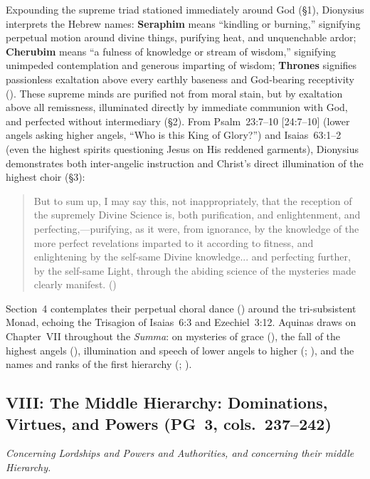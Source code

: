 Expounding the supreme triad stationed immediately around God (\S 1), Dionysius interprets the Hebrew names: \textbf{Seraphim} means ``kindling or burning,'' signifying perpetual motion around divine things, purifying heat, and unquenchable ardor; \textbf{Cherubim} means ``a fulness of knowledge or stream of wisdom,'' signifying unimpeded contemplation and generous imparting of wisdom; \textbf{Thrones} signifies passionless exaltation above every earthly baseness and God-bearing receptivity (). These supreme minds are purified not from moral stain, but by exaltation above all remissness, illuminated directly by immediate communion with God, and perfected without intermediary (\S 2). From Psalm~23:7--10 [24:7--10] (lower angels asking higher angels, ``Who is this King of Glory?'') and Isaias~63:1--2 (even the highest spirits questioning Jesus on His reddened garments), Dionysius demonstrates both inter-angelic instruction and Christ's direct illumination of the highest choir (\S 3):
\begin{quotation}
But to sum up, I may say this, not inappropriately, that the reception of the supremely Divine Science is, both purification, and enlightenment, and perfecting,---purifying, as it were, from ignorance, by the knowledge of the more perfect revelations imparted to it according to fitness, and enlightening by the self-same Divine knowledge... and perfecting further, by the self-same Light, through the abiding science of the mysteries made clearly manifest. ()
\end{quotation}
Section~4 contemplates their perpetual choral dance () around the tri-subsistent Monad, echoing the Trisagion of Isaias~6:3 and Ezechiel~3:12. Aquinas draws on Chapter~VII throughout the \emph{Summa}: on mysteries of grace (), the fall of the highest angels (), illumination and speech of lower angels to higher (; ), and the names and ranks of the first hierarchy (; ).

\subsection{VIII: The Middle Hierarchy: Dominations, Virtues, and Powers (PG~3, cols.~237--242)}
\label{sec:ch-viii}
\emph{Concerning Lordships and Powers and Authorities, and concerning their middle Hierarchy.}

